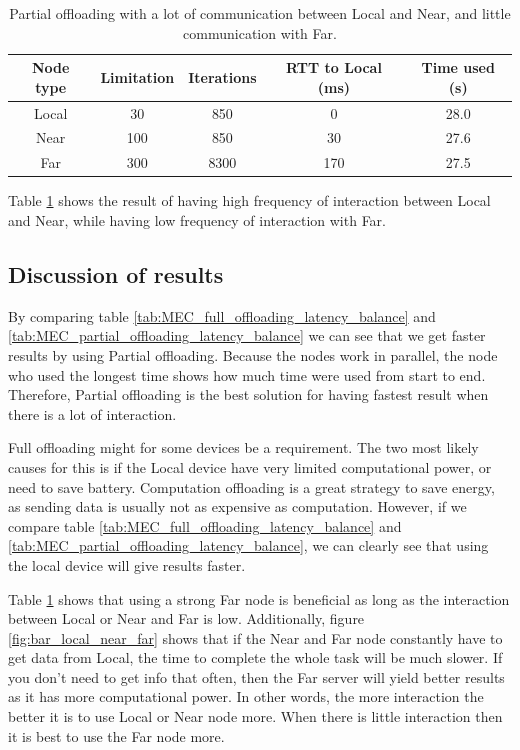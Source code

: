 \begin{table}[h!]
    \centering
    \begin{tabular}[c]{|c|c|c|c|c|}
        \hline
        Node type & Limitation & Iterations & RTT to Local (ms)& Time used (s)\\
        \hline
        \hline
        Local & 30 & 850 & 0 & 28.0  \\
        \hline
        Near & 100 & 850 & 30 & 27.6 \\
        \hline
        Far & 300 & 8300 & 170 & 27.5 \\
        \hline
    \end{tabular}
    \caption{Partial offloading with a lot of communication between Local and Near, and little communication with Far.}
    \label{tab:MEC_partial_offloading_little}
\end{table}

Table \ref{tab:MEC_partial_offloading_little} shows the result of having high frequency of interaction between Local and Near, while having low frequency of interaction with Far.



\subsection{Discussion of results} \label{subsection:MEC_comparison}%
By comparing table \ref{tab:MEC_full_offloading_latency_balance} and \ref{tab:MEC_partial_offloading_latency_balance} we can see that we get faster results by using Partial offloading. Because the nodes work in parallel, the node who used the longest time shows how much time were used from start to end. Therefore, Partial offloading is the best solution for having fastest result when there is a lot of interaction.


Full offloading might for some devices be a requirement. The two most likely causes for this is if the Local device have very limited computational power, or need to save battery. Computation offloading is a great strategy to save energy, as sending data is usually not as expensive as computation. However, if we compare table \ref{tab:MEC_full_offloading_latency_balance} and \ref{tab:MEC_partial_offloading_latency_balance}, we can clearly see that using the local device will give results faster.

Table \ref{tab:MEC_partial_offloading_little} shows that using a strong Far node is beneficial as long as the interaction between Local or Near and Far is low. Additionally, figure \ref{fig:bar_local_near_far} shows that if the Near and Far node constantly have to get data from Local, the time to complete the whole task will be much slower. If you don't need to get info that often, then the Far server will yield better results as it has more computational power. In other words, the more interaction the better it is to use Local or Near node more. When there is little interaction then it is best to use the Far node more.

